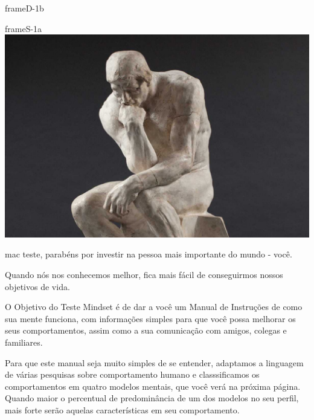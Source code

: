\documentclass[14pt]{extreport}
\begin{document}
%

\texto

\pagestyle{empty}
\begingroup
  \null
  \newpage
\endgroup



\ClearShipoutPicture

\begin{dynamiccontents*}{frameD-1b}
\end{dynamiccontents*}

\pagestyle{empty}

\newpage

\begin{staticcontents*}{frameS-1a}
\includegraphics[width=210mm]{img/fig1.jpg}
\end{staticcontents*}

\hfill
\vspace{100mm}

{mac teste}, parabéns por investir na pessoa mais importante do mundo - você.

Quando nós nos conhecemos melhor, fica mais fácil de conseguirmos nossos objetivos de vida.

O Objetivo do Teste Mindset é de dar a você um Manual de Instruções de como sua mente funciona, com informações simples para que você possa melhorar os seus comportamentos, assim como a sua comunicação com amigos, colegas e familiares.

Para que este manual seja muito simples de se entender, adaptamos a linguagem de várias pesquisas sobre comportamento humano e classsificamos os comportamentos em quatro modelos mentais, que você verá na próxima página.  Quando maior o percentual de predominância de um dos modelos no seu perfil, mais forte serão aquelas características em seu comportamento.  
\end{document}
